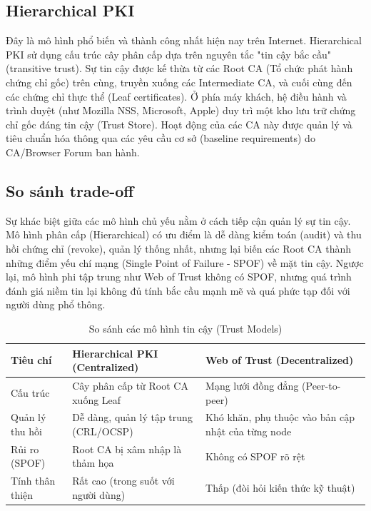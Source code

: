 \subsection{Hierarchical PKI}
Đây là mô hình phổ biến và thành công nhất hiện nay trên Internet. Hierarchical PKI sử dụng cấu trúc cây phân cấp dựa trên nguyên tắc "tin cậy bắc cầu" (transitive trust). Sự tin cậy được kế thừa từ các Root CA (Tổ chức phát hành chứng chỉ gốc) trên cùng, truyền xuống các Intermediate CA, và cuối cùng đến các chứng chỉ thực thể (Leaf certificates). Ở phía máy khách, hệ điều hành và trình duyệt (như Mozilla NSS, Microsoft, Apple) duy trì một kho lưu trữ chứng chỉ gốc đáng tin cậy (Trust Store). Hoạt động của các CA này được quản lý và tiêu chuẩn hóa thông qua các yêu cầu cơ sở (baseline requirements) do CA/Browser Forum \cite{CABForum} ban hành.

\subsection{So sánh trade-off}
Sự khác biệt giữa các mô hình chủ yếu nằm ở cách tiếp cận quản lý sự tin cậy. Mô hình phân cấp (Hierarchical) có ưu điểm là dễ dàng kiểm toán (audit) và thu hồi chứng chỉ (revoke), quản lý thống nhất, nhưng lại biến các Root CA thành những điểm yếu chí mạng (Single Point of Failure - SPOF) về mặt tin cậy. Ngược lại, mô hình phi tập trung như Web of Trust không có SPOF, nhưng quá trình đánh giá niềm tin lại không đủ tính bắc cầu mạnh mẽ và quá phức tạp đối với người dùng phổ thông.

\begin{table}[h]
    \centering
    \caption{So sánh các mô hình tin cậy (Trust Models)}
    \label{tab:trust-models}
    \begin{tabular}{|p{3cm}|p{7cm}|p{5cm}|}
        \hline
        \textbf{Tiêu chí} & \textbf{Hierarchical PKI (Centralized)} & \textbf{Web of Trust (Decentralized)} \\
        \hline
        Cấu trúc & Cây phân cấp từ Root CA xuống Leaf & Mạng lưới đồng đẳng (Peer-to-peer) \\
        \hline
        Quản lý thu hồi & Dễ dàng, quản lý tập trung (CRL/OCSP) & Khó khăn, phụ thuộc vào bản cập nhật của từng node \\
        \hline
        Rủi ro (SPOF) & Root CA bị xâm nhập là thảm họa & Không có SPOF rõ rệt \\
        \hline
        Tính thân thiện & Rất cao (trong suốt với người dùng) & Thấp (đòi hỏi kiến thức kỹ thuật) \\
        \hline
    \end{tabular}
\end{table}


